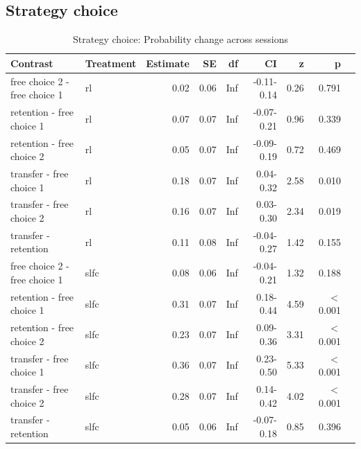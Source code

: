 \documentclass[pdflatex,sn-nature]{sn-jnl}%
\theoremstyle{thmstyleone}%
\theoremstyle{thmstyletwo}%
\theoremstyle{thmstylethree}%
\begin{document}
\begin{appendices}
\subsection{Strategy choice}


\begin{table}[p]
\caption{Strategy choice: Probability change across sessions}\label{strategychoice_theorybest_change}
\begin{tabular}{llrrrrrrr}
  \hline
 Contrast & Treatment & Estimate & SE & df & CI & z & p \\ 
  \hline
  free choice 2 - free choice 1 & rl & 0.02 & 0.06 & Inf & -0.11-0.14 & 0.26 &   0.791 \\ 
  retention - free choice 1 & rl & 0.07 & 0.07 & Inf & -0.07-0.21 & 0.96 &   0.339 \\ 
  retention - free choice 2 & rl & 0.05 & 0.07 & Inf & -0.09-0.19 & 0.72 &    0.469 \\ 
  transfer - free choice 1 & rl & 0.18 & 0.07 & Inf & 0.04-0.32 & 2.58 &    0.010 \\ 
  transfer - free choice 2 & rl & 0.16 & 0.07 & Inf & 0.03-0.30 & 2.34 &    0.019 \\ 
  transfer - retention & rl & 0.11 & 0.08 & Inf & -0.04-0.27 & 1.42 &    0.155 \\ 
  free choice 2 - free choice 1 & slfc & 0.08 & 0.06 & Inf & -0.04-0.21 & 1.32 &    0.188 \\ 
  retention - free choice 1 & slfc & 0.31 & 0.07 & Inf & 0.18-0.44 & 4.59 &  $<$  0.001 \\ 
  retention - free choice 2 & slfc & 0.23 & 0.07 & Inf & 0.09-0.36 & 3.31 &  $<$  0.001 \\ 
  transfer - free choice 1 & slfc & 0.36 & 0.07 & Inf & 0.23-0.50 & 5.33 &  $<$  0.001 \\ 
  transfer - free choice 2 & slfc & 0.28 & 0.07 & Inf & 0.14-0.42 & 4.02 &  $<$  0.001 \\ 
  transfer - retention & slfc & 0.05 & 0.06 & Inf & -0.07-0.18 & 0.85 &    0.396 \\ 
   \hline
\end{tabular}
\end{table}

\newpage


\end{appendices}
\end{document}
